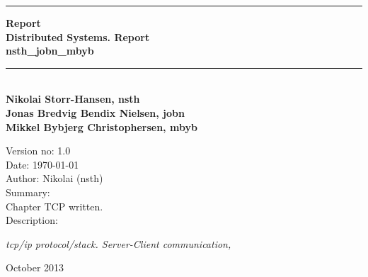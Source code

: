 \begin{titlepage}
\begin{center}
\rule{430pt}{3pt}
 {\huge\bfseries Report\\ }
 {\normalsize\bfseries Distributed Systems. Report\\ nsth\_jobn\textsl{}\_mbyb} 
  
 \rule{430pt}{3pt}\\[1cm]
 
 {\normalsize\bfseries Nikolai Storr-Hansen, nsth} \\
 {\normalsize\bfseries Jonas Bredvig Bendix Nielsen, jobn} \\
 {\normalsize\bfseries Mikkel Bybjerg Christophersen, mbyb} \\

 \vspace{2cm}
\end{center}
 

Version no: 1.0 \\

Date: \today \\

Author: Nikolai (nsth) \\

Summary: \\

Chapter TCP written.\\

Description: 

\textit{tcp/ip protocol/stack. Server-Client communication, } \\

\begin{center}

 \vfill
\textsl{}
 \vfill
{October 2013}
\end{center}
\end{titlepage}